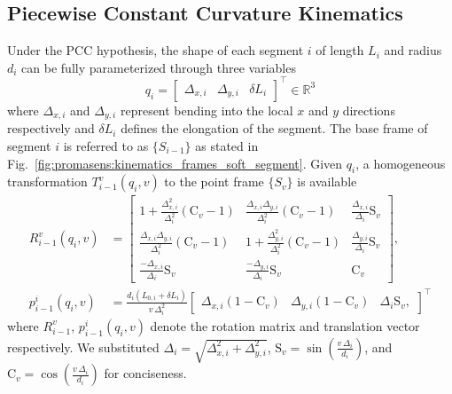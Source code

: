 \subsection{Piecewise Constant Curvature Kinematics}\label{sub:promasens:kinematic_model_pcc}

Under the \gls{PCC} hypothesis, the shape of each segment $i$ of length $L_{i}$ and radius $d_i$ can be fully parameterized through three variables
\begin{equation}
    q_i = \begin{bmatrix}\Delta_{x,i} & \Delta_{y,i} & \delta L_{i} \end{bmatrix}^{\top} \in \mathbb{R}^3
\end{equation}
where $\Delta_{x,i}$ and $\Delta_{y,i}$ represent bending into the local $x$ and $y$ directions respectively and $\delta L_i$ defines the elongation of the segment.
The base frame of segment $i$ is referred to as $\{S_{i-1}\}$ as stated in Fig.~\ref{fig:promasens:kinematics_frames_soft_segment}. Given $q_i$, a homogeneous transformation $T_{i-1}^{v}(q_i, v)$ to the point frame $\{S_{v}\}$ is available
\begin{equation}
\label{eq:promasens:transform_improved_q}
\begin{split}
    R_{i-1}^{v}(q_i,v) &=
    \begin{bmatrix}
        1 + \frac{\Delta_{x,i}^2}{\Delta_{i}^2} \left ( \mathrm{C}_v - 1 \right ) & \frac{\Delta_{x,i} \Delta_{y,i}}{\Delta_{i}^2} \left ( \mathrm{C}_v - 1 \right ) & \frac{\Delta_{x,i}}{\Delta_i} \mathrm{S}_v\\
        \frac{\Delta_{x,i} \Delta_{y,i}}{\Delta_{i}^2} \left ( \mathrm{C}_v - 1 \right ) & 1 + \frac{\Delta_{y,i}^2}{\Delta_{i}^2} \left ( \mathrm{C}_v - 1 \right ) & \frac{\Delta_{y,i}}{\Delta_i} \mathrm{S}_v\\
        \frac{-\Delta_{x,i}}{\Delta_i} \mathrm{S}_v & \frac{-\Delta_{y,i}}{\Delta_i} \mathrm{S}_v & \mathrm{C}_v
    \end{bmatrix},\\
    p_{i-1}^{i}(q_i,v) &= \frac{d_i ( L_{0,i}+\delta L_i)}{v \, \Delta_i^2}
    \begin{bmatrix}
        \Delta_{x,i} (1 - \mathrm{C}_v) & \Delta_{y,i} (1 - \mathrm{C}_v) & \Delta_{i} \mathrm{S}_v,
    \end{bmatrix}^{\top}
\end{split}
\end{equation}
where $R_{i-1}^{v}$, $p_{i-1}^{i}(q_i,v)$ denote the rotation matrix and translation vector respectively. We substituted $\Delta_i = \sqrt{\Delta_{x,i}^2 + \Delta_{y,i}^2}$, $\mathrm{S}_v = \sin \left (\frac{v \, \Delta_i}{d_i} \right )$, and $\mathrm{C}_v = \cos \left ( \frac{v \, \Delta_i}{d_i} \right )$ for conciseness.

